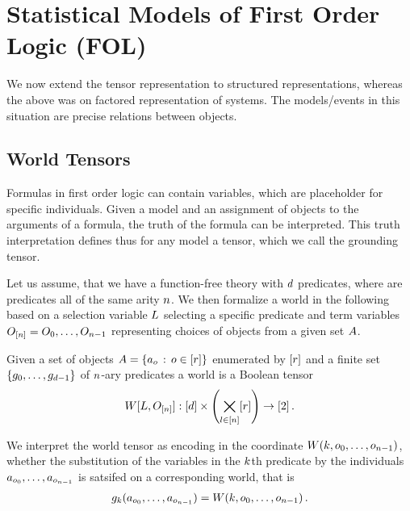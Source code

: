 \section{Statistical Models of First Order Logic (FOL)}\label{cha:folModels}

We now extend the tensor representation to structured representations, whereas the above was on factored representation of systems.
The models/events in this situation are precise relations between objects.





%
\subsection{World Tensors}


Formulas in first order logic can contain variables, which are placeholder for specific individuals.
Given a model and an assignment of objects to the arguments of a formula, the truth of the formula can be interpreted.
This truth interpretation defines thus for any model a tensor, which we call the grounding tensor.

Let us assume, that we have a function-free theory with $d$ predicates, where are predicates all of the same arity $n$.
We then formalize a world in the following based on a selection variable $L$ selecting a specific predicate and term variables $O_{[n]}=O_{0},\ldots,O_{n-1}$ representing choices of objects from a given set $A$.

\begin{definition}
	Given a set of objects $A=\{a_{o} \, : \, o\in[r]\}$ enumerated by $[r]$ and a finite set $\{g_{0},\ldots,g_{d-1}\}$ of $n$-ary predicates a world is a Boolean tensor
	\begin{align}
		W[L,O_{[n]}] : [d] \times \left( \bigtimes_{l\in[n]} [r] \right) \rightarrow [2] \, . 
	\end{align}
	
	We interpret the world tensor as encoding in the coordinate $W(k,o_{0},\ldots,o_{n-1})$, whether the substitution of the variables in the $k$th predicate by the individuals $a_{o_{0}},\ldots,a_{o_{n-1}}$ is satsifed on a corresponding world, that is
	\begin{align*}
		g_{k}(a_{o_{0}},\ldots,a_{o_{n-1}}) = W(k,o_{0},\ldots,o_{n-1}) \, . 
	\end{align*}
\end{definition}


